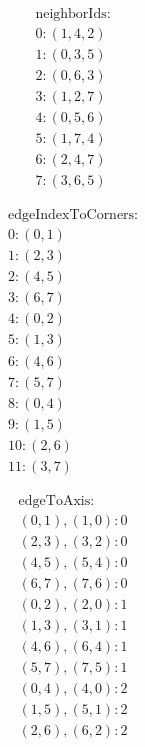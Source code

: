 \begin{figure}
	\begin{subfigure}[t]{0.24\textwidth}
		\begin{align*}
		\text{neighborIds:} \\
		0: (1, 4, 2) \\
		1: (0, 3, 5) \\
		2: (0, 6, 3) \\
		3: (1, 2, 7) \\
		4: (0, 5, 6) \\
		5: (1, 7, 4) \\
		6: (2, 4, 7) \\
		7: (3, 6, 5)
		\end{align*}
	\end{subfigure}
	\begin{subfigure}[t]{0.24\textwidth}
		\begin{align*}
		\text{edgeIndexToCorners:} \\
		 0: (0, 1) \\
		 1: (2, 3) \\
		 2: (4, 5) \\
		 3: (6, 7) \\
		 4: (0, 2) \\
		 5: (1, 3) \\
		 6: (4, 6) \\
		 7: (5, 7) \\
		 8: (0, 4) \\
		 9: (1, 5) \\
		10: (2, 6) \\
		11: (3, 7)
		\end{align*}
	\end{subfigure}
	\begin{subfigure}[t]{0.24\textwidth}
		\begin{align*}
		\text{edgeToAxis:} \\
		(0, 1), (1, 0): 0 \\
		(2, 3), (3, 2): 0 \\
		(4, 5), (5, 4): 0 \\
		(6, 7), (7, 6): 0 \\
		(0, 2), (2, 0): 1 \\
		(1, 3), (3, 1): 1 \\
		(4, 6), (6, 4): 1 \\
		(5, 7), (7, 5): 1 \\
		(0, 4), (4, 0): 2 \\
		(1, 5), (5, 1): 2 \\
		(2, 6), (6, 2): 2 \\

\end{align*}
\end{subfigure}
\end{figure}
